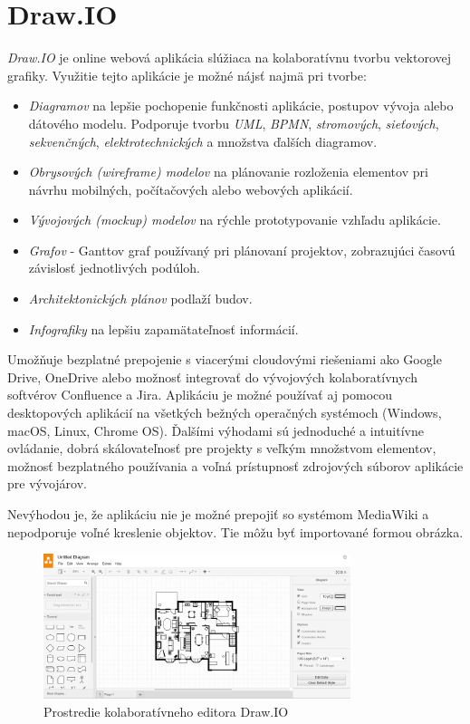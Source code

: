 \section{Draw.IO}
\textit{Draw.IO} je online webová aplikácia slúžiaca na kolaboratívnu tvorbu vektorovej grafiky. Využitie tejto aplikácie je možné nájsť najmä pri tvorbe:
\begin{itemize}
	\item \textit{Diagramov} na lepšie pochopenie funkčnosti aplikácie, postupov vývoja alebo dátového modelu. Podporuje tvorbu \textit{UML}, \textit{BPMN}, \textit{stromových}, \textit{sieťových}, \textit{sekvenčných}, \textit{elektrotechnických} a množstva ďalších diagramov.
	\item \textit{Obrysových (wireframe) modelov} na plánovanie rozloženia elementov pri návrhu mobilných, počítačových alebo webových aplikácií.
	\item \textit{Vývojových (mockup) modelov} na rýchle prototypovanie vzhľadu aplikácie.
	\item \textit{Grafov} - Ganttov graf používaný pri plánovaní projektov, zobrazujúci časovú závislosť jednotlivých podúloh.
	\item \textit{Architektonických plánov} podlaží budov.
	\item \textit{Infografiky} na lepšiu zapamätateľnosť informácií.
\end{itemize}
Umožňuje bezplatné prepojenie s viacerými cloudovými riešeniami ako Google Drive, OneDrive alebo možnosť integrovať do vývojových kolaboratívnych softvérov Confluence a Jira. Aplikáciu je možné používať aj pomocou desktopových aplikácií na všetkých bežných operačných systémoch (Windows, macOS, Linux, Chrome OS). 
Ďalšími výhodami sú jednoduché a intuitívne ovládanie, dobrá skálovateľnosť pre projekty s veľkým množstvom elementov, možnosť bezplatného používania a voľná prístupnosť zdrojových súborov aplikácie pre vývojárov.

Nevýhodou je, že aplikáciu nie je možné prepojiť so systémom MediaWiki a nepodporuje voľné kreslenie objektov. Tie môžu byť importované formou obrázka.

\begin{figure}[h]
	\centerline{\includegraphics[width=0.8\textwidth]{images/drawio}}
	\caption[Editor Draw.IO]{Prostredie kolaboratívneho editora Draw.IO}
	\label{obr:DrawIO}
\end{figure}
\FloatBarrier